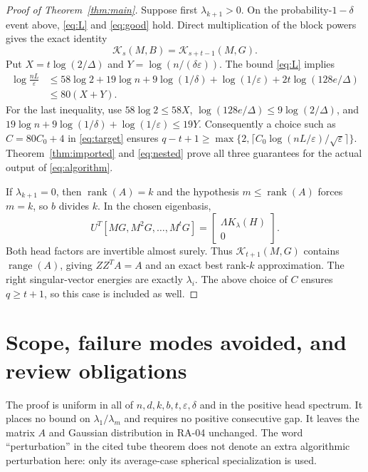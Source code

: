 \documentclass[11pt]{article}
\numberwithin{equation}{section}
\theoremstyle{definition}
\newcommand{\K}{\mathcal K}
\newcommand{\rank}{\operatorname{rank}}
\newcommand{\range}{\operatorname{range}}
\begin{document}
\begin{proof}[Proof of Theorem~\ref{thm:main}]
Suppose first $\lambda_{k+1}>0$. On the probability-$1-\delta$ event above, \eqref{eq:L} and \eqref{eq:good} hold. Direct multiplication of the block powers gives the exact identity
\begin{equation}\label{eq:nested}
\K_s(M,B)=\K_{s+t-1}(M,G).
\end{equation}
Put $X=t\log(2/\Delta)$ and $Y=\log(n/(\delta\varepsilon))$. The bound \eqref{eq:L} implies
\begin{align*}
\log\frac{nL}{\varepsilon}
&\le58\log2+19\log n+9\log(1/\delta)+\log(1/\varepsilon)
 +2t\log(128e/\Delta)\\
&\le 80(X+Y).
\end{align*}
For the last inequality, use $58\log2\le58X$,
$\log(128e/\Delta)\le9\log(2/\Delta)$, and
$19\log n+9\log(1/\delta)+\log(1/\varepsilon)\le19Y$.
Consequently a choice such as $C=80C_0+4$ in \eqref{eq:target} ensures
$q-t+1\ge\max\{2,\lceil C_0\log(nL/\varepsilon)/\sqrt\varepsilon\rceil\}$.
Theorem~\ref{thm:imported} and \eqref{eq:nested} prove all three guarantees for the actual output of \eqref{eq:algorithm}.

If $\lambda_{k+1}=0$, then $\rank(A)=k$ and the hypothesis $m\le\rank(A)$ forces $m=k$, so $b$ divides $k$. In the chosen eigenbasis,
\[
U^T[MG,M^2G,\ldots,M^tG]
=\begin{bmatrix}\Lambda K_\lambda(H)\\0\end{bmatrix}.
\]
Both head factors are invertible almost surely. Thus $\K_{t+1}(M,G)$ contains $\range(A)$, giving $ZZ^TA=A$ and an exact best rank-$k$ approximation. The right singular-vector energies are exactly $\lambda_i$. The above choice of $C$ ensures $q\ge t+1$, so this case is included as well.
\end{proof}

\section{Scope, failure modes avoided, and review obligations}\label{sec:audit}
The proof is uniform in all of $n,d,k,b,t,\varepsilon,\delta$ and in the positive head spectrum. It places no bound on $\lambda_1/\lambda_m$ and requires no positive consecutive gap. It leaves the matrix $A$ and Gaussian distribution in RA-04 unchanged. The word ``perturbation'' in the cited tube theorem does not denote an extra algorithmic perturbation here: only its average-case spherical specialization is used.
\end{document}
